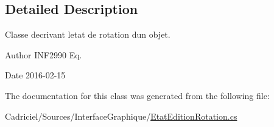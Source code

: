 \subsection{Detailed Description}
Classe decrivant l\textquotesingle{}etat de rotation d\textquotesingle{}un objet. 

\begin{DoxyAuthor}{Author}
I\+N\+F2990 Eq. 
\end{DoxyAuthor}
\begin{DoxyDate}{Date}
2016-\/02-\/15 
\end{DoxyDate}


The documentation for this class was generated from the following file\+:\begin{DoxyCompactItemize}
\item 
Cadriciel/\+Sources/\+Interface\+Graphique/\hyperlink{_etat_edition_rotation_8cs}{Etat\+Edition\+Rotation.\+cs}\end{DoxyCompactItemize}
